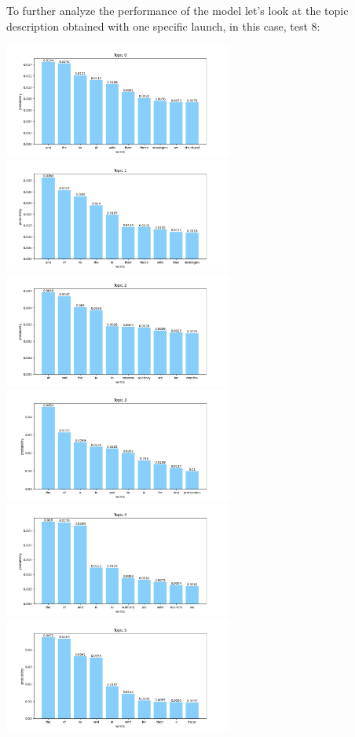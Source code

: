 \documentclass[10pt]{article} %
\begin{document}
	To further analyze the performance of the model let's look at the topic description obtained with one specific launch, in this case, test 8:
	
	\begin{center}
		\includegraphics[width=7.5cm]{images/plots/test_8/topic_0.png}
		\includegraphics[width=7.5cm]{images/plots/test_8/topic_1.png}
		\includegraphics[width=7.5cm]{images/plots/test_8/topic_2.png}
		\includegraphics[width=7.5cm]{images/plots/test_8/topic_3.png}
		\includegraphics[width=7.5cm]{images/plots/test_8/topic_4.png}
		\includegraphics[width=7.5cm]{images/plots/test_8/topic_5.png}

\end{center}
\end{document}
